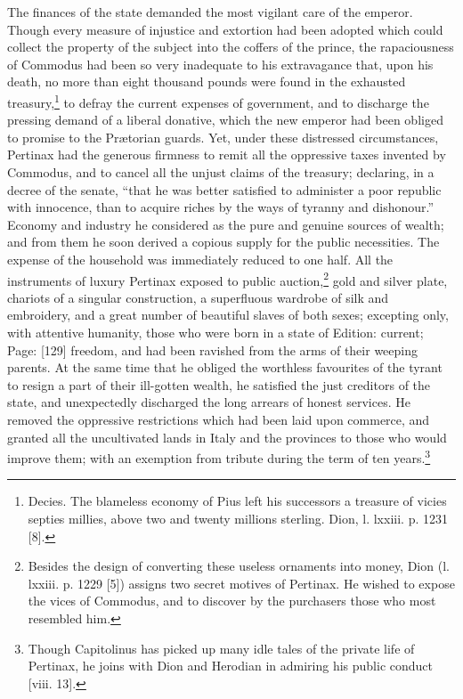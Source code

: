 The finances of the state demanded the most vigilant care of the emperor. Though every measure of injustice and extortion had been adopted which could collect the property of the subject into the coffers of the prince, the rapaciousness of Commodus had been so very inadequate to his extravagance that, upon his death, no more than eight thousand pounds were found in the exhausted treasury,\footnote{Decies. The blameless economy of Pius left his successors a treasure of vicies septies millies, above two and twenty millions sterling. Dion, l. lxxiii. p. 1231 [8].} to defray the current expenses of government, and to discharge the pressing demand of a liberal donative, which the new emperor had been obliged to promise to the Prætorian guards. Yet, under these distressed circumstances, Pertinax had the generous firmness to remit all the oppressive taxes invented by Commodus, and to cancel all the unjust claims of the treasury; declaring, in a decree of the senate, \texthebrew{“}that he was better satisfied to administer a poor republic with innocence, than to acquire riches by the ways of tyranny and dishonour.\texthebrew{}” Economy and industry he considered as the pure and genuine sources of wealth; and from them he soon derived a copious supply for the public necessities. The expense of the household was immediately reduced to one half. All the instruments of luxury Pertinax exposed to public auction,\footnote{Besides the design of converting these useless ornaments into money, Dion (l. lxxiii. p. 1229 [5]) assigns two secret motives of Pertinax. He wished to expose the vices of Commodus, and to discover by the purchasers those who most resembled him.} gold and silver plate, chariots of a singular construction, a superfluous wardrobe of silk and embroidery, and a great number of beautiful slaves of both sexes; excepting only, with attentive humanity, those who were born in a state of Edition: current; Page: [129] freedom, and had been ravished from the arms of their weeping parents. At the same time that he obliged the worthless favourites of the tyrant to resign a part of their ill-gotten wealth, he satisfied the just creditors of the state, and unexpectedly discharged the long arrears of honest services. He removed the oppressive restrictions which had been laid upon commerce, and granted all the uncultivated lands in Italy and the provinces to those who would improve them; with an exemption from tribute during the term of ten years.\footnote{Though Capitolinus has picked up many idle tales of the private life of Pertinax, he joins with Dion and Herodian in admiring his public conduct [viii. 13].}

